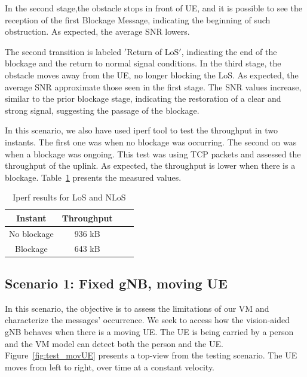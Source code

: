 In the second stage,the obstacle stops in front of UE, and it is possible to see the reception of the first Blockage Message, indicating the beginning of such obstruction.
As expected, the average SNR lowers.

The second transition is labeled \('\)Return of LoS\('\), indicating the end of the blockage and the return to normal signal conditions.
In the third stage, the obstacle moves away from the UE, no longer blocking the LoS\@.
As expected, the average SNR approximate those seen in the first stage.
The SNR values increase, similar to the prior blockage stage, indicating the restoration of a clear and strong signal, suggesting the passage of the blockage.

In this scenario, we also have used iperf tool to test the throughput in two instants.
The first one was when no blockage was occurring.
The second on was when a blockage was ongoing.
This test was using TCP packets and assessed the throughput of the uplink.
As expected, the throughput is lower when there is a blockage.
Table~\ref{tab:iperf} presents the measured values.


\begin{table}[h]
    \centering %
    \begin{tabular}{|c|c|c|c|}
        \hline
        \textbf{Instant} & \textbf{Throughput} \\ \hline
        No blockage & 936 kB \\ \hline
        Blockage   &  643 kB\\ \hline
    \end{tabular}
    \caption{Iperf results for LoS and NLoS} %
    \label{tab:iperf} %
\end{table}


\subsection{Scenario 1: Fixed gNB, moving UE}\label{subsec:scenario-0.1:-fixed-gnb-moving-ue}

In this scenario, the objective is to assess the limitations of our VM and characterize the messages' occurrence\@.
We seek to access how the vision-aided gNB behaves when there is a moving UE\@.
The UE is being carried by a person and the VM model can detect both the person and the UE\@.
Figure~\ref{fig:test_movUE} presents a top-view from the testing scenario.
The UE moves from left to right, over time at a constant velocity.

